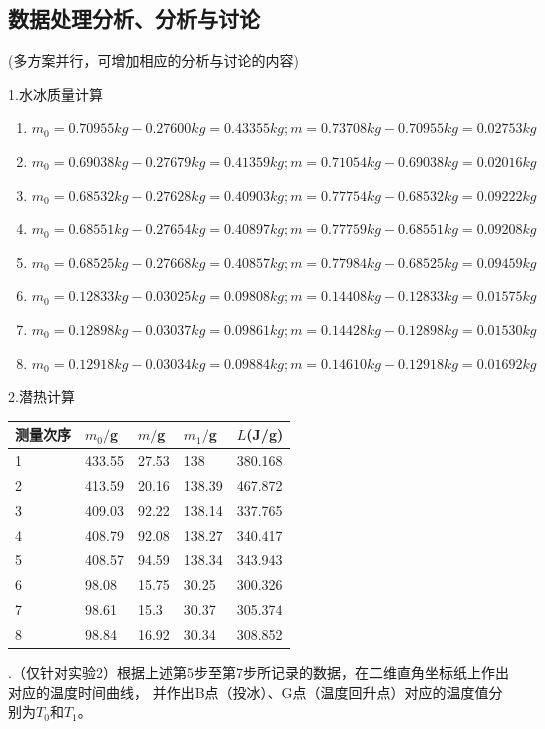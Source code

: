 \documentclass[dvipsnames, svgnames,a4paper,11pt]{article}
\begin{document}
\subsection{数据处理分析、分析与讨论}
(多方案并行，可增加相应的分析与讨论的内容)\par
1.水冰质量计算\\
\begin{enumerate}
	\item $m_0=0.70955kg-0.27600kg=0.43355kg;m=0.73708kg-0.70955kg=0.02753kg$
	\item $m_0=0.69038kg-0.27679kg=0.41359kg;m=0.71054kg-0.69038kg=0.02016kg$
	\item $m_0=0.68532kg-0.27628kg=0.40903kg;m=0.77754kg-0.68532kg=0.09222kg$
	\item $m_0=0.68551kg-0.27654kg=0.40897kg;m=0.77759kg-0.68551kg=0.09208kg$
	\item $m_0=0.68525kg-0.27668kg=0.40857kg;m=0.77984kg-0.68525kg=0.09459kg$
	\item $m_0=0.12833kg-0.03025kg=0.09808kg;m=0.14408kg-0.12833kg=0.01575kg$
	\item $m_0=0.12898kg-0.03037kg=0.09861kg;m=0.14428kg-0.12898kg=0.01530kg$
	\item $m_0=0.12918kg-0.03034kg=0.09884kg;m=0.14610kg-0.12918kg=0.01692kg$
\end{enumerate}\newpage
2.潜热计算
\begin{table}[!h]
	\renewcommand\arraystretch{1.7}
	\centering
	\begin{tabularx}{\textwidth}{|X|X|X|X|X|}
	\hline
	测量次序& $m_0/$g &$m/$g& $m_1/$g&$L$(J/g) \\
	\hline
	1&433.55&27.53&138&380.168\\
	\hline
	2&413.59&20.16&138.39&467.872\\
	\hline
	3&409.03&92.22&138.14&337.765\\
	\hline
	4&408.79&92.08&138.27&340.417\\
	\hline
	5&408.57&94.59&138.34&343.943\\
	\hline
	6&98.08&15.75&30.25&300.326\\
	\hline
	7&98.61&15.3&30.37&305.374\\
	\hline
	8&98.84&16.92&30.34&308.852\\
	\hline
	\end{tabularx}
\end{table}.（仅针对实验2）根据上述第5步至第7步所记录的数据，在二维直角坐标纸上作出对应的温度时间曲线，
并作出B点（投冰）、G点（温度回升点）对应的温度值分别为$T_0$和$T_1$。
\end{document}

